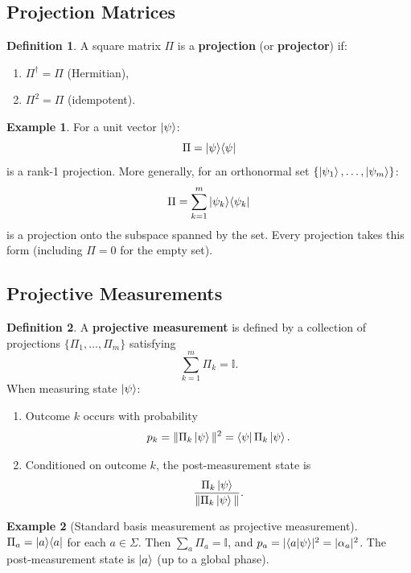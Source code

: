 \documentclass[11pt]{article}
\theoremstyle{definition}
\newtheorem{definition}{Definition}[section]
\newtheorem{example}{Example}[section]
\begin{document}
\subsection{Projection Matrices}

\begin{definition}
A square matrix $\Pi$ is a \textbf{projection} (or \textbf{projector}) if:
\begin{enumerate}
    \item $\Pi^\dagger = \Pi$ \quad (Hermitian),
    \item $\Pi^2 = \Pi$ \quad (idempotent).
\end{enumerate}
\end{definition}

\begin{example}
For a unit vector $\ket{\psi}$:
\[
    \Pi = \ket{\psi}\!\bra{\psi}
\]
is a rank-1 projection.  More generally, for an orthonormal set $\{\ket{\psi_1},\dots,\ket{\psi_m}\}$:
\[
    \Pi = \sum_{k=1}^{m}\ket{\psi_k}\!\bra{\psi_k}
\]
is a projection onto the subspace spanned by the set.  Every projection takes this form (including $\Pi=0$ for the empty set).
\end{example}

\subsection{Projective Measurements}

\begin{definition}
A \textbf{projective measurement} is defined by a collection of projections $\{\Pi_1,\dots,\Pi_m\}$ satisfying
\[
    \sum_{k=1}^{m}\Pi_k = \mathbb{I}.
\]
When measuring state $\ket{\psi}$:
\begin{enumerate}
    \item Outcome $k$ occurs with probability
    \[
        p_k = \|\Pi_k\ket{\psi}\|^2 = \bra{\psi}\Pi_k\ket{\psi}.
    \]
    \item Conditioned on outcome $k$, the post-measurement state is
    \[
        \frac{\Pi_k\ket{\psi}}{\|\Pi_k\ket{\psi}\|}.
    \]
\end{enumerate}
\end{definition}

\begin{example}[Standard basis measurement as projective measurement]
$\Pi_a = \ket{a}\!\bra{a}$ for each $a\in\Sigma$.  Then $\sum_a\Pi_a=\mathbb{I}$, and $p_a = |\!\braket{a}{\psi}\!|^2 = |\alpha_a|^2$.  The post-measurement state is $\ket{a}$ (up to a global phase).
\end{example}
\end{document}
